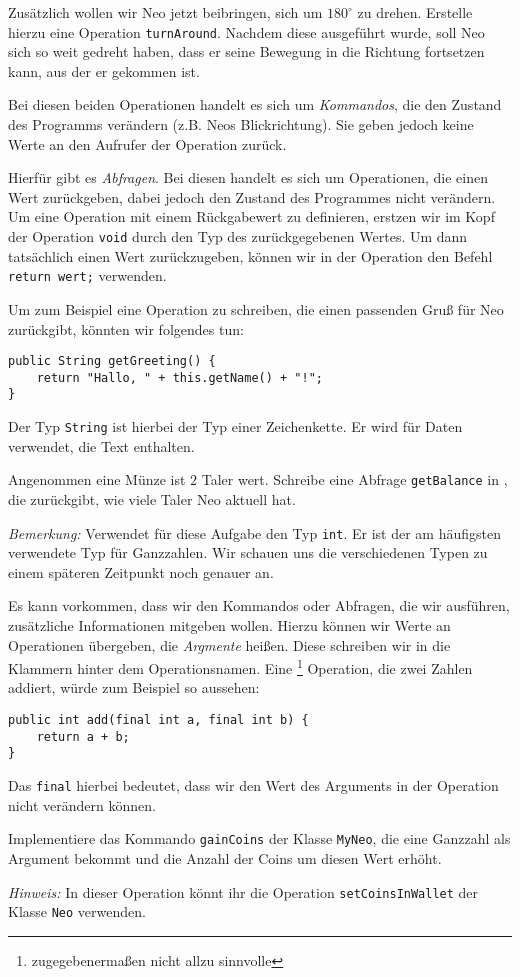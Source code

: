     \subexcercise
    Zusätzlich wollen wir Neo jetzt beibringen, sich um \(180^\circ\) zu drehen.
    Erstelle hierzu eine Operation \lstinline{turnAround}.
    Nachdem diese ausgeführt wurde, soll Neo sich so weit gedreht haben, dass er seine Bewegung in die Richtung fortsetzen kann, aus der er gekommen ist.


    Bei diesen beiden Operationen handelt es sich um \emph{Kommandos}, die den Zustand des Programms verändern (z.B. Neos Blickrichtung). Sie geben jedoch keine Werte an den Aufrufer der Operation zurück.

    Hierfür gibt es \emph{Abfragen}. Bei diesen handelt es sich um Operationen, die einen Wert zurückgeben, dabei jedoch den Zustand des Programmes nicht verändern. Um eine Operation mit einem Rückgabewert zu definieren, erstzen wir im Kopf der Operation \lstinline{void} durch den Typ des zurückgegebenen Wertes. Um dann tatsächlich einen Wert zurückzugeben, können wir in der Operation den Befehl \lstinline{return wert;} verwenden.

    Um zum Beispiel eine Operation zu schreiben, die einen passenden Gruß für Neo zurückgibt, könnten wir folgendes tun:
    \begin{lstlisting}
public String getGreeting() {
    return "Hallo, " + this.getName() + "!";
}
    \end{lstlisting}
    Der Typ \lstinline{String} ist hierbei der Typ einer Zeichenkette. Er wird für Daten verwendet, die Text enthalten.

    \excercise Angenommen eine Münze ist \(2\) Taler wert. Schreibe eine Abfrage
    \lstinline{getBalance} in \ownclass{}, die  zurückgibt, wie viele Taler Neo aktuell hat.

    \emph{Bemerkung:} Verwendet für diese Aufgabe den Typ \lstinline{int}. Er ist der am häufigsten verwendete Typ für Ganzzahlen. Wir schauen uns die verschiedenen Typen zu einem späteren Zeitpunkt noch genauer an.

        Es kann vorkommen, dass wir den Kommandos oder Abfragen, die wir ausführen, zusätzliche Informationen mitgeben wollen. Hierzu können wir Werte an Operationen übergeben, die \emph{Argmente} heißen. Diese schreiben wir in die Klammern hinter dem Operationsnamen. Eine \footnote{zugegebenermaßen nicht allzu sinnvolle} Operation, die zwei Zahlen addiert, würde zum Beispiel so aussehen:
    \begin{lstlisting}
public int add(final int a, final int b) {
    return a + b;
}
    \end{lstlisting}
    Das \lstinline{final} hierbei bedeutet, dass wir den Wert des Arguments in der Operation nicht verändern können.

    \excercise Implementiere das Kommando \lstinline{gainCoins} der Klasse \lstinline{MyNeo}, die eine Ganzzahl als Argument bekommt und die Anzahl der Coins um diesen Wert erhöht.

    \emph{Hinweis:} In dieser Operation könnt ihr die Operation \lstinline{setCoinsInWallet} der Klasse \lstinline{Neo} verwenden.
